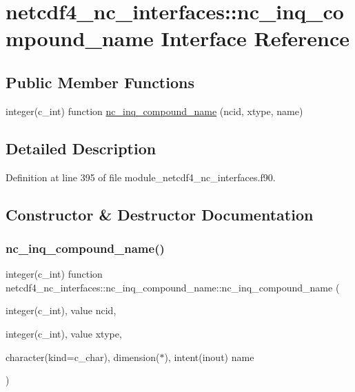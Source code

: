 \hypertarget{interfacenetcdf4__nc__interfaces_1_1nc__inq__compound__name}{}\section{netcdf4\+\_\+nc\+\_\+interfaces\+:\+:nc\+\_\+inq\+\_\+compound\+\_\+name Interface Reference}
\label{interfacenetcdf4__nc__interfaces_1_1nc__inq__compound__name}
\subsection*{Public Member Functions}
\begin{DoxyCompactItemize}
\item 
integer(c\+\_\+int) function \hyperlink{interfacenetcdf4__nc__interfaces_1_1nc__inq__compound__name_af7f8cc2485f3deceec3cc4783f75bf6d}{nc\+\_\+inq\+\_\+compound\+\_\+name} (ncid, xtype, name)
\end{DoxyCompactItemize}


\subsection{Detailed Description}


Definition at line 395 of file module\+\_\+netcdf4\+\_\+nc\+\_\+interfaces.\+f90.



\subsection{Constructor \& Destructor Documentation}
\mbox{\label{interfacenetcdf4__nc__interfaces_1_1nc__inq__compound__name_af7f8cc2485f3deceec3cc4783f75bf6d}} 
\subsubsection{\texorpdfstring{nc\+\_\+inq\+\_\+compound\+\_\+name()}{nc\_inq\_compound\_name()}}
{\footnotesize\ttfamily integer(c\+\_\+int) function netcdf4\+\_\+nc\+\_\+interfaces\+::nc\+\_\+inq\+\_\+compound\+\_\+name\+::nc\+\_\+inq\+\_\+compound\+\_\+name (\begin{DoxyParamCaption}\item[{integer(c\+\_\+int), value}]{ncid,  }\item[{integer(c\+\_\+int), value}]{xtype,  }\item[{character(kind=c\+\_\+char), dimension($\ast$), intent(inout)}]{name }\end{DoxyParamCaption})}



